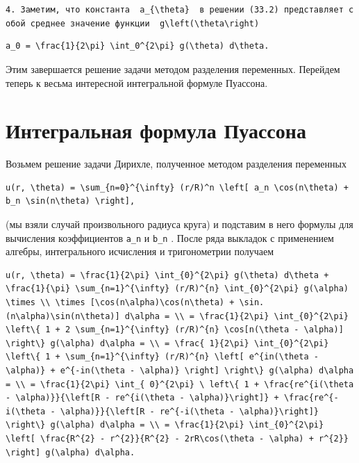 \documentclass[
  ukrainian,
]{article}
\begin{document}
\texttt{4.\ Заметим,\ что\ константа\ \ \textquotesingle{}a\_\{\textbackslash{}theta\}\textquotesingle{}\ \ в\ решении\ (33.2)\ представляет\ собой\ среднее\ значение\ функции\ \ \textquotesingle{}g\textbackslash{}left(\textbackslash{}theta\textbackslash{}right)\textquotesingle{}}

\begin{verbatim}
a_0 = \frac{1}{2\pi} \int_0^{2\pi} g(\theta) d\theta.
\end{verbatim}

Этим завершается решение задачи методом разделения переменных. Перейдем
теперь к весьма интересной интегральной формуле Пуассона.

\section{Интегральная формула
Пуассона}\label{ux438ux43dux442ux435ux433ux440ux430ux43bux44cux43dux430ux44f-ux444ux43eux440ux43cux443ux43bux430-ux43fux443ux430ux441ux441ux43eux43dux430}

Возьмем решение задачи Дирихле, полученное методом разделения переменных

\begin{verbatim}
u(r, \theta) = \sum_{n=0}^{\infty} (r/R)^n \left[ a_n \cos(n\theta) + b_n \sin(n\theta) \right],
\end{verbatim}

(мы взяли случай произвольного радиуса круга) и подставим в него формулы
для вычисления коэффициентов \texttt{a\_n} и \texttt{b\_n} . После ряда
выкладок с применением алгебры, интегрального исчисления и тригонометрии
получаем

\begin{verbatim}
u(r, \theta) = \frac{1}{2\pi} \int_{0}^{2\pi} g(\theta) d\theta + \frac{1}{\pi} \sum_{n=1}^{\infty} (r/R)^{n} \int_{0}^{2\pi} g(\alpha) \times \\ \times [\cos(n\alpha)\cos(n\theta) + \sin. (n\alpha)\sin(n\theta)] d\alpha = \\ = \frac{1}{2\pi} \int_{0}^{2\pi} \left\{ 1 + 2 \sum_{n=1}^{\infty} (r/R)^{n} \cos[n(\theta - \alpha)] \right\} g(\alpha) d\alpha = \\ = \frac{ 1}{2\pi} \int_{0}^{2\pi} \left\{ 1 + \sum_{n=1}^{\infty} (r/R)^{n} \left[ e^{in(\theta - \alpha)} + e^{-in(\theta - \alpha)} \right] \right\} g(\alpha) d\alpha = \\ = \frac{1}{2\pi} \int_{ 0}^{2\pi} \ left\{ 1 + \frac{re^{i(\theta - \alpha)}}{\left[R - re^{i(\theta - \alpha)}\right]} + \frac{re^{-i(\theta - \alpha)}}{\left[R - re^{-i(\theta - \alpha)}\right]} \right\} g(\alpha) d\alpha = \\ = \frac{1}{2\pi} \int_{0}^{2\pi} \left[ \frac{R^{2} - r^{2}}{R^{2} - 2rR\cos(\theta - \alpha) + r^{2}} \right] g(\alpha) d\alpha.
\end{verbatim}
\end{document}
